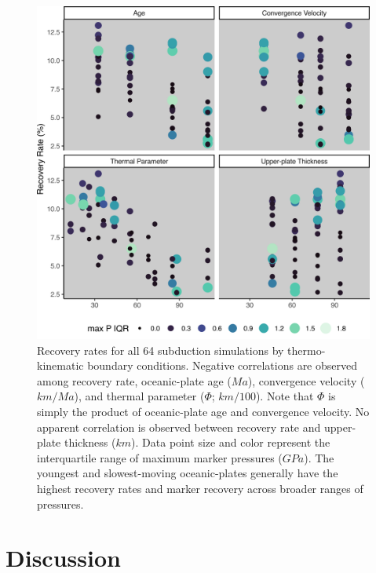 \begin{figure}[htbp]

{\centering \includegraphics[width=1\linewidth,]{assets/figs/chpt4/recRate} 

}

\caption[Recovery rates for all 64 subduction simulations]{Recovery rates for all 64 subduction simulations by thermo-kinematic boundary conditions. Negative correlations are observed among recovery rate, oceanic-plate age (\(Ma\)), convergence velocity (\(km/Ma\)), and thermal parameter (\(\Phi\); \(km/100\)). Note that \(\Phi\) is simply the product of oceanic-plate age and convergence velocity. No apparent correlation is observed between recovery rate and upper-plate thickness (\(km\)). Data point size and color represent the interquartile range of maximum marker pressures (\(GPa\)). The youngest and slowest-moving oceanic-plates generally have the highest recovery rates and marker recovery across broader ranges of pressures.}\label{fig:recRate}
\end{figure}

\hypertarget{chpt4Discussion}{%
\section{Discussion}\label{chpt4Discussion}}


